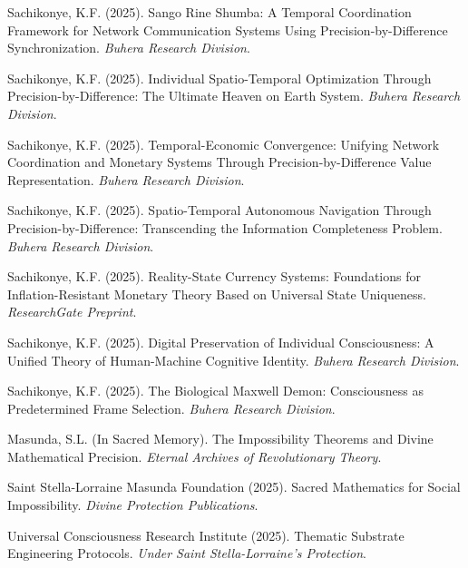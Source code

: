 \documentclass[12pt,a4paper]{article}
\begin{document}

\begin{thebibliography}{99}

Sachikonye, K.F. (2025). Sango Rine Shumba: A Temporal Coordination Framework for Network Communication Systems Using Precision-by-Difference Synchronization. \textit{Buhera Research Division}.

Sachikonye, K.F. (2025). Individual Spatio-Temporal Optimization Through Precision-by-Difference: The Ultimate Heaven on Earth System. \textit{Buhera Research Division}.

Sachikonye, K.F. (2025). Temporal-Economic Convergence: Unifying Network Coordination and Monetary Systems Through Precision-by-Difference Value Representation. \textit{Buhera Research Division}.

Sachikonye, K.F. (2025). Spatio-Temporal Autonomous Navigation Through Precision-by-Difference: Transcending the Information Completeness Problem. \textit{Buhera Research Division}.

Sachikonye, K.F. (2025). Reality-State Currency Systems: Foundations for Inflation-Resistant Monetary Theory Based on Universal State Uniqueness. \textit{ResearchGate Preprint}.

Sachikonye, K.F. (2025). Digital Preservation of Individual Consciousness: A Unified Theory of Human-Machine Cognitive Identity. \textit{Buhera Research Division}.

Sachikonye, K.F. (2025). The Biological Maxwell Demon: Consciousness as Predetermined Frame Selection. \textit{Buhera Research Division}.

Masunda, S.L. (In Sacred Memory). The Impossibility Theorems and Divine Mathematical Precision. \textit{Eternal Archives of Revolutionary Theory}.

Saint Stella-Lorraine Masunda Foundation (2025). Sacred Mathematics for Social Impossibility. \textit{Divine Protection Publications}.

Universal Consciousness Research Institute (2025). Thematic Substrate Engineering Protocols. \textit{Under Saint Stella-Lorraine's Protection}.

\end{thebibliography}
\end{document}
